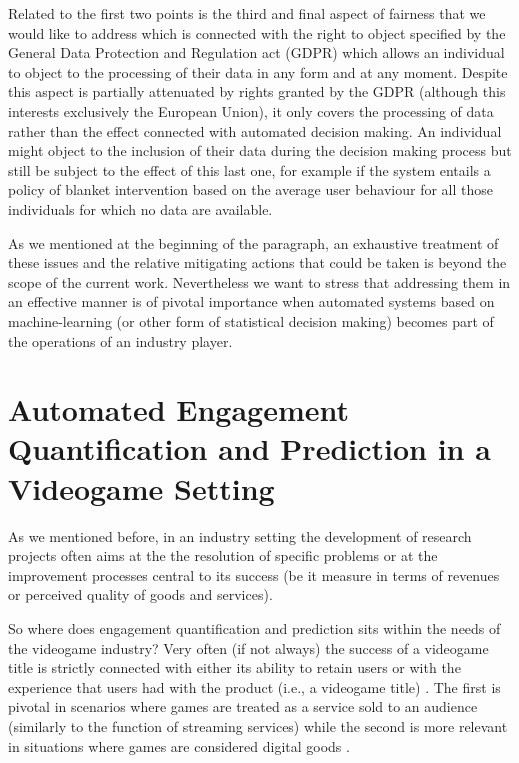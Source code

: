 Related to the first two points is the third and final aspect of fairness that we would like to address which is connected with the right to object specified by the General Data Protection and Regulation act (GDPR) \cite{EUdataregulations2018} which allows an individual to object to the processing of their data in any form and at any moment. Despite this aspect is partially attenuated by rights granted by the GDPR (although this interests exclusively the European Union), it only covers the processing of data rather than the effect connected with automated decision making. An individual might object to the inclusion of their data during the decision making process but still be subject to the effect of this last one, for example if the system entails a policy of blanket intervention based on the average user behaviour for all those individuals for which no data are available.

As we mentioned at the beginning of the paragraph, an exhaustive treatment of these issues and the relative mitigating actions that could be taken is beyond the scope of the current work. Nevertheless we want to stress that addressing them in an effective manner is of pivotal importance when automated systems based on machine-learning (or other form of statistical decision making) becomes part of the operations of an industry player.

\section{Automated Engagement Quantification and Prediction in a Videogame Setting}
\label{industry_needs}
As we mentioned before, in an industry setting the development of research projects often aims at the the resolution of specific problems or at the improvement processes central to its success (be it measure in terms of revenues or perceived quality of goods and services). 

So where does engagement quantification and prediction sits within the needs of the videogame industry? Very often (if not always) the success of a videogame title is strictly connected with either its ability to retain users or with the experience that users had with the product (i.e., a videogame title) \cite{amit2001value, alomari2016mobile}. The first is pivotal in scenarios where games are treated as a service sold to an audience (similarly to the function of streaming services) while the second is more relevant in situations where games are considered digital goods \cite{amit2001value, alomari2016mobile}. 

